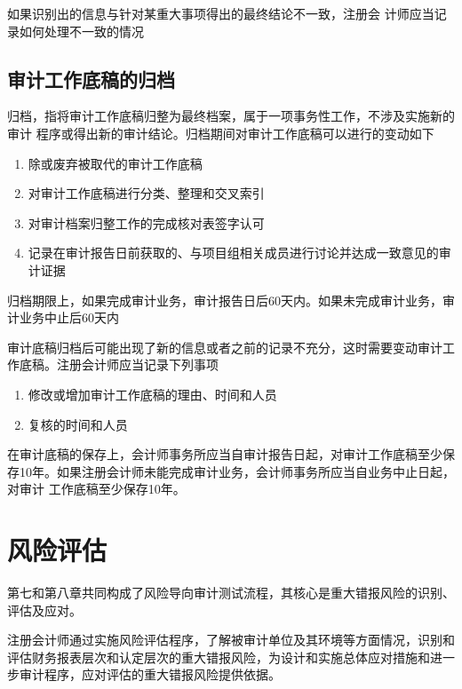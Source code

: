 \documentclass[UTF8,12pt]{ctexart}
\numberwithin{equation}{section} %
\numberwithin{figure}{section}
\numberwithin{table}{section}
\begin{document}
	如果识别出的信息与针对某重大事项得出的最终结论不一致，注册会 计师应当记录如何处理不一致的情况
	
	\subsection{审计工作底稿的归档}
	归档，指将审计工作底稿归整为最终档案，属于一项事务性工作，不涉及实施新的审计 程序或得出新的审计结论。归档期间对审计工作底稿可以进行的变动如下
	\begin{enumerate}
		\item 除或废弃被取代的审计工作底稿
		
		\item 对审计工作底稿进行分类、整理和交叉索引
		
		\item 对审计档案归整工作的完成核对表签字认可
		
		\item 记录在审计报告日前获取的、与项目组相关成员进行讨论并达成一致意见的审计证据
	\end{enumerate}
	
	归档期限上，如果完成审计业务，审计报告日后60天内。如果未完成审计业务，审计业务中止后60天内
	
	审计底稿归档后可能出现了新的信息或者之前的记录不充分，这时需要变动审计工作底稿。注册会计师应当记录下列事项
	\begin{enumerate}
		\item 修改或增加审计工作底稿的理由、时间和人员
	
		\item 复核的时间和人员
	\end{enumerate}
	
	在审计底稿的保存上，会计师事务所应当自审计报告日起，对审计工作底稿至少保存10年。如果注册会计师未能完成审计业务，会计师事务所应当自业务中止日起，对审计 工作底稿至少保存10年。
	
	\newpage
	\section{风险评估}
	第七和第八章共同构成了风险导向审计测试流程，其核心是重大错报风险的识别、评估及应对。
	
	注册会计师通过实施风险评估程序，了解被审计单位及其环境等方面情况，识别和评估财务报表层次和认定层次的重大错报风险，为设计和实施总体应对措施和进一步审计程序，应对评估的重大错报风险提供依据。
\end{document}
